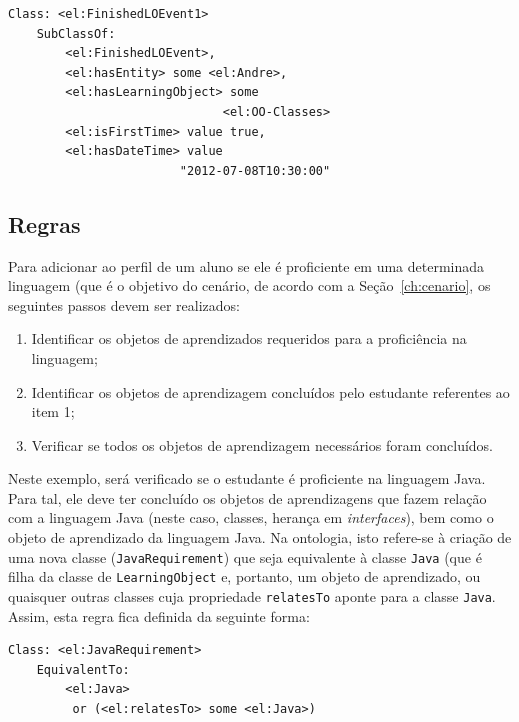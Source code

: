 \documentclass[times, 10pt, twocolumn]{article}
\begin{document}
\begin{code}
\begin{lstlisting}
Class: <el:FinishedLOEvent1>
    SubClassOf: 
        <el:FinishedLOEvent>,
        <el:hasEntity> some <el:Andre>,
        <el:hasLearningObject> some 
	                          <el:OO-Classes>
        <el:isFirstTime> value true,
        <el:hasDateTime> value 
	                    "2012-07-08T10:30:00"
\end{lstlisting}
\end{code}

\subsection{Regras}

Para adicionar ao perfil de um aluno se ele é proficiente em uma determinada linguagem (que é o objetivo do cenário, de acordo com a Seção~\ref{ch:cenario}, os seguintes passos devem ser realizados:

\begin{enumerate}
  \item Identificar os objetos de aprendizados requeridos para a proficiência na linguagem;
  \item Identificar os objetos de aprendizagem concluídos pelo estudante referentes ao item 1;
  \item Verificar se todos os objetos de aprendizagem necessários foram concluídos.
\end{enumerate}

Neste exemplo, será verificado se o estudante é proficiente na linguagem Java. Para tal, ele deve ter concluído os objetos de aprendizagens que fazem relação com a linguagem Java (neste caso, classes, herança em {\em interfaces}), bem como o objeto de aprendizado da linguagem Java. Na ontologia, isto refere-se à criação de uma nova classe ({\tt JavaRequirement}) que seja equivalente à classe {\tt Java} (que é filha da classe de {\tt LearningObject} e, portanto, um objeto de aprendizado, ou quaisquer outras classes cuja propriedade {\tt relatesTo} aponte para a classe {\tt Java}. Assim, esta regra fica definida da seguinte forma:

\begin{code}
\begin{lstlisting}
Class: <el:JavaRequirement>
    EquivalentTo: 
        <el:Java>
         or (<el:relatesTo> some <el:Java>)
\end{lstlisting}
\end{code}
\end{document}
